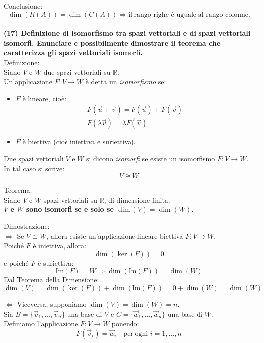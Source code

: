 \documentclass[10pt]{extarticle}
\begin{document}
Conclusione:
\[
\dim(R(A)) = \dim(C(A)) \Rightarrow \text{il rango righe è uguale al rango colonne.}
\]
\vspace{1em} \\
\textbf{(17) Definizione di isomorfismo tra spazi vettoriali e di spazi vettoriali isomorfi. Enunciare e possibilmente dimostrare il teorema che caratterizza gli spazi vettoriali isomorfi.}\\
Definizione:\\
Siano $V$ e $W$ due spazi vettoriali su $\mathbb{R}$.\\
Un'applicazione $F : V \to W$ è detta un \textit{isomorfismo} se:
\begin{itemize}
    \item $F$ è lineare, cioè:
    \begin{align*}
        F(\vec{u} + \vec{v}) = F(\vec{u}) + F(\vec{v}) \\
        F(\lambda \vec{v}) = \lambda F(\vec{v})
    \end{align*}
    \item $F$ è biettiva (cioè iniettiva e suriettiva).
\end{itemize}

Due spazi vettoriali $V$ e $W$ si dicono \textit{isomorfi} se esiste un isomorfismo $F: V \to W$. In tal caso si scrive:
\[
V \cong W
\]

Teorema:\\
Siano $V$ e $W$ spazi vettoriali su $\mathbb{R}$, di dimensione finita.\\
\textbf{$V$ e $W$ sono isomorfi se e solo se $\dim(V) = \dim(W)$.}

Dimostrazione:\\

$\Rightarrow$ Se $V \cong W$, allora esiste un'applicazione lineare biettiva $F : V \to W$.\\
Poiché $F$ è iniettiva, allora:
\[
\dim(\ker(F)) = 0
\]
e poiché $F$ è suriettiva:
\[
\text{Im}(F) = W \Rightarrow \dim(\text{Im}(F)) = \dim(W)
\]
Dal Teorema della Dimensione:
\[
\dim(V) = \dim(\ker(F)) + \dim(\text{Im}(F)) = 0 + \dim(W) = \dim(W)
\]

$\Leftarrow$ Viceversa, supponiamo $\dim(V) = \dim(W) = n$.\\
Sia $B = \{ \vec{v}_1, \dots, \vec{v}_n \}$ una base di $V$ e $C = \{ \vec{w}_1, \dots, \vec{w}_n \}$ una base di $W$.\\

Definiamo l'applicazione $F: V \to W$ ponendo:
\[
F(\vec{v}_i) = \vec{w}_i \quad \text{per ogni } i = 1, \dots, n
\]
\end{document}
